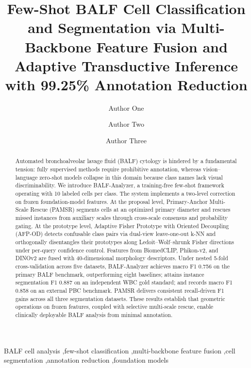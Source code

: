 \documentclass[preprint,review,12pt]{elsarticle}
\begin{document}
\begin{frontmatter}

\title{Few-Shot BALF Cell Classification and Segmentation via Multi-Backbone Feature Fusion and Adaptive Transductive Inference with 99.25\% Annotation Reduction}

\author[addr1]{Author One}
\author[addr1]{Author Two}
\author[addr1]{Author Three}

\address[addr1]{Department of Biomedical Engineering, University Name, City, Country}

\begin{abstract}
Automated bronchoalveolar lavage fluid (BALF) cytology is hindered by a fundamental tension: fully supervised methods require prohibitive annotation, whereas vision--language zero-shot models collapse in this domain because class names lack visual discriminability. We introduce BALF-Analyzer, a training-free few-shot framework operating with 10 labeled cells per class. The system implements a two-level correction on frozen foundation-model features. At the proposal level, Primary-Anchor Multi-Scale Rescue (PAMSR) segments cells at an optimized primary diameter and rescues missed instances from auxiliary scales through cross-scale consensus and probability gating. At the prototype level, Adaptive Fisher Prototype with Oriented Decoupling (AFP-OD) detects confusable class pairs via dual-view leave-one-out k-NN and orthogonally disentangles their prototypes along Ledoit--Wolf--shrunk Fisher directions under per-query confidence control. Features from BiomedCLIP, Phikon-v2, and DINOv2 are fused with 40-dimensional morphology descriptors. Under nested 5-fold cross-validation across five datasets, BALF-Analyzer achieves macro F1 0.756 on the primary BALF benchmark, outperforming eight baselines; attains instance segmentation F1 0.887 on an independent WBC gold standard; and records macro F1 0.858 on an external PBC benchmark. PAMSR delivers consistent recall-driven F1 gains across all three segmentation datasets. These results establish that geometric operations on frozen features, coupled with selective multi-scale rescue, enable clinically deployable BALF analysis from minimal annotation.
\end{abstract}

\begin{keyword}
BALF cell analysis \sep few-shot classification \sep multi-backbone feature fusion \sep cell segmentation \sep annotation reduction \sep foundation models
\end{keyword}

\end{frontmatter}
\end{document}

